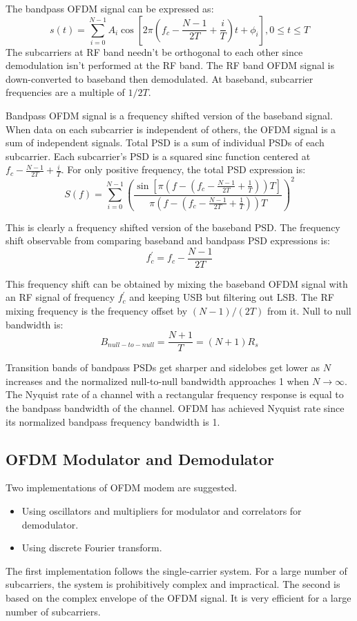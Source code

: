 The bandpass \gls{OFDM} signal can be expressed as\cite{fuqin}:
$$s(t) = \sum_{i=0}^{N-1}A_i\cos\left[ 2\pi\left( f_c-\frac{N-1}{2T}+\frac{i}{T}\right)t + \phi_i\right], 0\leq t\leq T$$
The \gls{subcarrier}s at \gls{RF} band needn't be \gls{orthogonal} to each other since demodulation isn't performed at the \gls{RF} band\cite{fuqin}. The RF band OFDM signal is down-converted to baseband then demodulated. At baseband, subcarrier frequencies are a multiple of $1/2T$\cite{fuqin}.

Bandpass OFDM signal is a frequency shifted version of the baseband signal. When data on each subcarrier is independent of others, the OFDM signal is a sum of independent signals. Total PSD is a sum of individual PSDs of each subcarrier. Each subcarrier's PSD is a squared sinc function centered at $f_c - \frac{N-1}{2T}+\frac{i}{T}$. For only positive frequency, the total PSD expression is:
$$S(f) = \sum_{i=0}^{N-1}\left( \frac{\sin\left[ \pi(f-(f_c-\frac{N-1}{2T}+\frac{1}{T}))T\right]}{\pi(f-(f_c-\frac{N-1}{2T}+\frac{1}{T}))T}\right)^2$$

This is clearly a frequency shifted version of the baseband \gls{PSD}. The frequency shift observable from comparing baseband and bandpass PSD expressions is:
$$f_c^\prime = f_c - \frac{N-1}{2T}$$

This frequency shift can be obtained by mixing the baseband OFDM signal with an RF signal of frequency $f_c^\prime$ and keeping \gls{USB} but filtering out \gls{LSB}. The RF mixing frequency is the frequency offset by $(N-1)/(2T)$ from it.
Null to null bandwidth is:
$$B_{null-to-null}=\frac{N+1}{T}=(N+1)R_s$$

Transition bands of bandpass PSDs get sharper and sidelobes get lower as $N$ increases and the normalized null-to-null bandwidth approaches 1 when $N\to\infty$\cite{fuqin}.
The Nyquist rate of a channel with a rectangular frequency response is equal to the bandpass bandwidth of the channel. OFDM has achieved Nyquist rate since its normalized bandpass frequency bandwidth is 1\cite{fuqin}. 

\subsection{OFDM Modulator and Demodulator}
Two implementations of OFDM modem are suggested.
\begin{itemize}
	\item Using oscillators and multipliers for modulator and correlators for demodulator.
	\item Using discrete Fourier transform.
\end{itemize}
The first implementation follows the single-carrier system. For a large number of subcarriers, the system is prohibitively complex and impractical. The second is based on the complex envelope of the OFDM signal. It is very efficient for a large number of subcarriers.

